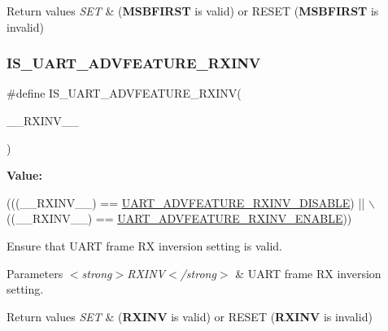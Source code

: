 \begin{DoxyRetVals}{Return values}
{\em S\+ET} & ({\bfseries M\+S\+B\+F\+I\+R\+ST} is valid) or R\+E\+S\+ET ({\bfseries M\+S\+B\+F\+I\+R\+ST} is invalid) \\
\hline
\end{DoxyRetVals}
\mbox{\label{group___u_a_r_t___private___macros_ga7f53ad0eca57b7ffabcae9007b7bbfa6}} 
\subsubsection{\texorpdfstring{I\+S\+\_\+\+U\+A\+R\+T\+\_\+\+A\+D\+V\+F\+E\+A\+T\+U\+R\+E\+\_\+\+R\+X\+I\+NV}{IS\_UART\_ADVFEATURE\_RXINV}}
{\footnotesize\ttfamily \#define I\+S\+\_\+\+U\+A\+R\+T\+\_\+\+A\+D\+V\+F\+E\+A\+T\+U\+R\+E\+\_\+\+R\+X\+I\+NV(\begin{DoxyParamCaption}\item[{}]{\+\_\+\+\_\+\+R\+X\+I\+N\+V\+\_\+\+\_\+ }\end{DoxyParamCaption})}

{\bfseries Value\+:}
\begin{DoxyCode}
(((\_\_RXINV\_\_) == \hyperlink{group___u_a_r_t___rx___inv_gae9598a2e4fec4b9166ad5eab24027870}{UART\_ADVFEATURE\_RXINV\_DISABLE}) || \(\backslash\)
                                             ((\_\_RXINV\_\_) == 
      \hyperlink{group___u_a_r_t___rx___inv_gae12343bc2373080ae518ce7b536205cb}{UART\_ADVFEATURE\_RXINV\_ENABLE}))
\end{DoxyCode}


Ensure that U\+A\+RT frame RX inversion setting is valid. 


\begin{DoxyParams}{Parameters}
{\em $<$strong$>$\+R\+X\+I\+N\+V$<$/strong$>$} & U\+A\+RT frame RX inversion setting. \\
\hline
\end{DoxyParams}

\begin{DoxyRetVals}{Return values}
{\em S\+ET} & ({\bfseries R\+X\+I\+NV} is valid) or R\+E\+S\+ET ({\bfseries R\+X\+I\+NV} is invalid) \\
\hline
\end{DoxyRetVals}
\mbox{\label{group___u_a_r_t___private___macros_gaf095ad39d3035f722c6976921a84dbea}} 
